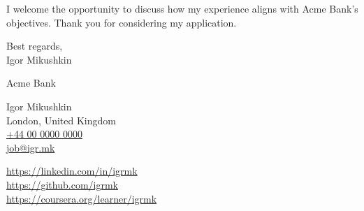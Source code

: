 \documentclass[9pt,a4paper]{juicv}
\makeatletter
\newcommand{\myphone}{\href{tel:+440000000000}{+44 00 0000 0000}}
\newcommand{\myemail}{\href{mailto:job@igr.mk}{job@igr.mk}}
\makeatother
\begin{document}
\begin{paracol}{2}
I welcome the opportunity to discuss how my experience
aligns with Acme Bank's objectives.
Thank you for considering my application.
\vspace{12pt}

Best regards,\\
Igor Mikushkin

\newpage
\switchcolumn
\raggedright
\setlength{\parskip}{0em}

    Acme Bank

    Igor Mikushkin\\
    London, United Kingdom\\
    \myphone\\
    \myemail

    \vspace{6pt}
    {
        \small
        \href{https://linkedin.com/in/igrmk}{https://linkedin.com/in/igrmk}\\
        \href{https://github.com/igrmk}{https://github.com/igrmk}\\
        \href{https://coursera.org/learner/igrmk}{https://coursera.org/learner/igrmk}
        \par
    }

\end{paracol}
\end{document}
